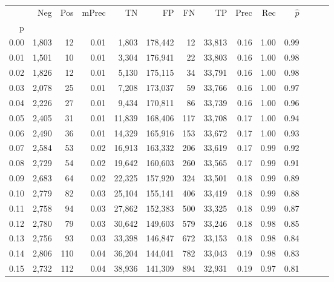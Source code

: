 \begin{tabular}{rrrrrrrrrrrrrr}
\toprule
{} &    Neg &  Pos & mPrec &       TN &       FP &      FN &      TP &  Prec &   Rec & $\hat{p}$ \\
p    &        &      &       &          &          &         &         &       &       &           \\
\midrule
0.00 &  1,803 &   12 &  0.01 &    1,803 &  178,442 &      12 &  33,813 &  0.16 &  1.00 &      0.99 \\
0.01 &  1,501 &   10 &  0.01 &    3,304 &  176,941 &      22 &  33,803 &  0.16 &  1.00 &      0.98 \\
0.02 &  1,826 &   12 &  0.01 &    5,130 &  175,115 &      34 &  33,791 &  0.16 &  1.00 &      0.98 \\
0.03 &  2,078 &   25 &  0.01 &    7,208 &  173,037 &      59 &  33,766 &  0.16 &  1.00 &      0.97 \\
0.04 &  2,226 &   27 &  0.01 &    9,434 &  170,811 &      86 &  33,739 &  0.16 &  1.00 &      0.96 \\
0.05 &  2,405 &   31 &  0.01 &   11,839 &  168,406 &     117 &  33,708 &  0.17 &  1.00 &      0.94 \\
0.06 &  2,490 &   36 &  0.01 &   14,329 &  165,916 &     153 &  33,672 &  0.17 &  1.00 &      0.93 \\
0.07 &  2,584 &   53 &  0.02 &   16,913 &  163,332 &     206 &  33,619 &  0.17 &  0.99 &      0.92 \\
0.08 &  2,729 &   54 &  0.02 &   19,642 &  160,603 &     260 &  33,565 &  0.17 &  0.99 &      0.91 \\
0.09 &  2,683 &   64 &  0.02 &   22,325 &  157,920 &     324 &  33,501 &  0.18 &  0.99 &      0.89 \\
0.10 &  2,779 &   82 &  0.03 &   25,104 &  155,141 &     406 &  33,419 &  0.18 &  0.99 &      0.88 \\
0.11 &  2,758 &   94 &  0.03 &   27,862 &  152,383 &     500 &  33,325 &  0.18 &  0.99 &      0.87 \\
0.12 &  2,780 &   79 &  0.03 &   30,642 &  149,603 &     579 &  33,246 &  0.18 &  0.98 &      0.85 \\
0.13 &  2,756 &   93 &  0.03 &   33,398 &  146,847 &     672 &  33,153 &  0.18 &  0.98 &      0.84 \\
0.14 &  2,806 &  110 &  0.04 &   36,204 &  144,041 &     782 &  33,043 &  0.19 &  0.98 &      0.83 \\
0.15 &  2,732 &  112 &  0.04 &   38,936 &  141,309 &     894 &  32,931 &  0.19 &  0.97 &      0.81 \\

\end{tabular}
